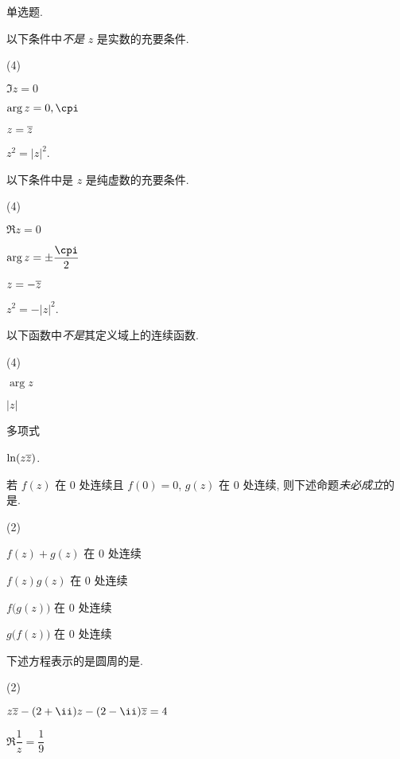 
\begin{homework}
  \item 单选题.
  \begin{homework}
    \item 以下条件中\fillbrace{}\emph{不是} $z$ 是实数的充要条件.
    \begin{exchoice}(4)
      \item $\Im z=0$
      \item $\arg z=0,\cpi$
      \item $z=\overline z$
      \item $z^2=|z|^2$.
    \end{exchoice}
    \item 以下条件中\fillbrace{}是 $z$ 是纯虚数的充要条件.
    \begin{exchoice}(4)
      \item $\Re z=0$
      \item $\arg z=\pm\dfrac\cpi2$
      \item $z=-\overline z$
      \item $z^2=-|z|^2$.
    \end{exchoice}
    \item 以下函数中\fillbrace{}\emph{不是}其定义域上的连续函数.
    \begin{exchoice}(4)
      \item $\arg z$
      \item $|z|$
      \item 多项式
      \item $\ln(z\overline z)$.
    \end{exchoice}
    \item 若 $f(z)$ 在 $0$ 处连续且 $f(0)=0$, $g(z)$ 在 $0$ 处连续, 则下述命题\emph{未必成立}的是\fillbrace{}.
    \begin{exchoice}(2)
      \item $f(z)+g(z)$ 在 $0$ 处连续
      \item $f(z)g(z)$ 在 $0$ 处连续
      \item $f\bigl(g(z)\bigr)$ 在 $0$ 处连续
      \item $g\bigl(f(z)\bigr)$ 在 $0$ 处连续
    \end{exchoice}
    \item 下述方程表示的是圆周的是\fillbrace{}.
    \begin{exchoice}(2)
      \item $z\ov z-(2+\ii)z-(2-\ii)\ov z=4$
      \item $\Re\dfrac{1}{z}=\dfrac{1}{9}$

\end{exchoice}
\end{homework}
\end{homework}
